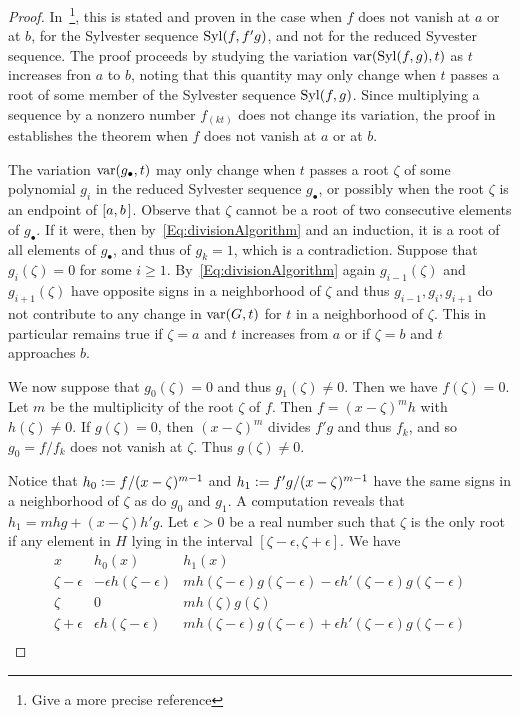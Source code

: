 \documentclass[12pt]{amsart}
\theoremstyle{definition}
\DeclareMathOperator{\var}{{\rm var}}
\DeclareMathOperator{\Syl}{{\rm Syl}}
\begin{document}
\begin{proof}
  In~\cite{BCR}\footnote{Give a more precise reference}, this is stated and proven in the case when $f$ does not vanish at $a$ or at $b$,
  for the Sylvester sequence $\Syl(f,f'g)$, and not for the reduced Syvester sequence.
  The proof proceeds by studying the variation $\var(\Syl(f,g), t)$ as $t$ increases fron $a$ to $b$, noting that this quantity may only
  change when $t$ passes a root of some member of the Sylvester sequence $\Syl(f,g)$.
  Since multiplying a sequence by a nonzero number $f_(kt)$ does not change its variation, the proof in~\cite{BCR} establishes the theorem
  when $f$ does not vanish at $a$ or at $b$.

  The variation $\var(g_\bullet,t)$ may only change when $t$ passes a root $\zeta$ of some polynomial $g_i$ in the reduced Sylvester
  sequence $g_\bullet$, or possibly when the
  root $\zeta$ is an   endpoint of $[a,b\hspace{.05cm}]$.
  Observe that $\zeta$ cannot be a root of two consecutive elements of $g_\bullet$.
  If it were, then by~\eqref{Eq:divisionAlgorithm} and an induction, it is a root of all elements of $g_\bullet$, and thus of $g_k=1$, which is a
  contradiction.
  Suppose that $g_i(\zeta)=0$ for some $i\geq 1$.
  By~\eqref{Eq:divisionAlgorithm} again $g_{i-1}(\zeta)$ and $g_{i+1}(\zeta)$ have opposite signs in a neighborhood of $\zeta$ and thus
  $g_{i-1},g_i,g_{i+1}$ do not contribute to any change in $\var(G,t)$ for $t$ in a neighborhood of $\zeta$.
  This in particular remains true if $\zeta=a$ and $t$ increases from $a$ or if $\zeta=b$ and $t$ approaches $b$.

  We now suppose that $g_0(\zeta)=0$ and thus $g_1(\zeta)\neq 0$.
  Then we have $f(\zeta)=0$.
  Let $m$ be the multiplicity of the root $\zeta$ of $f$.
  Then $f=(x-\zeta)^m h$ with $h(\zeta)\neq 0$.
  If $g(\zeta)=0$, then $(x-\zeta)^m$ divides $f'g$ and thus $f_k$, and so $g_0=f/f_k$ does not vanish at $\zeta$.
  Thus $g(\zeta)\neq 0$.

  Notice that $h_0\vcentcolon=f/(x-\zeta)^{m-1}$ and $h_1\vcentcolon=f'g/(x-\zeta)^{m-1}$ have the same signs in a neighborhood of $\zeta$
  as do $g_0$ and $g_1$.
  A computation reveals that $h_1=mhg+(x{-}\zeta)h'g$. 
 Let $\epsilon>0$ be a real number such that $\zeta$ is the only root if any element in $H$ lying in the interval
 $[\zeta-\epsilon,\zeta+\epsilon]$.
 We have
 \[
 \begin{array}{c|c|l}
   x & h_0(x) & h_1(x)\\\hline
   \zeta-\epsilon & -\epsilon h(\zeta-\epsilon)  & mh(\zeta-\epsilon)g(\zeta-\epsilon) - \epsilon h'(\zeta-\epsilon)g(\zeta-\epsilon)\\
   \zeta     &     0    &   mh(\zeta)g(\zeta)\\
   \zeta+\epsilon & \epsilon h(\zeta-\epsilon)  & mh(\zeta-\epsilon)g(\zeta-\epsilon) + \epsilon h'(\zeta-\epsilon)g(\zeta-\epsilon)\\
 \end{array}
 \]
  

\end{proof}
\end{document}
